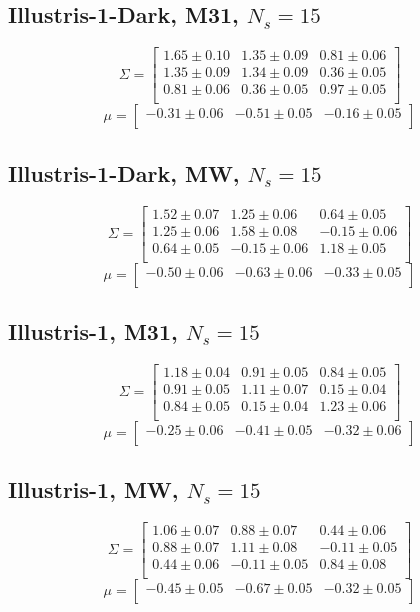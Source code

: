 \documentclass[a4paper,fleqn,usenatbib]{mnras}
\begin{document}
\subsection{Illustris-1-Dark, M31, $N_s=15$}
\[
\Sigma=
\begin{bmatrix}
1.65 \pm 0.10 & 1.35 \pm 0.09 & 0.81 \pm 0.06\\
1.35 \pm 0.09 & 1.34 \pm 0.09 & 0.36 \pm 0.05\\
0.81 \pm 0.06 & 0.36 \pm 0.05 & 0.97 \pm 0.05\\
\end{bmatrix}
\]
\[
\mu=
\begin{bmatrix}
-0.31 \pm 0.06 & -0.51 \pm 0.05 & -0.16 \pm 0.05\\
\end{bmatrix}
\]
\subsection{Illustris-1-Dark, MW, $N_s=15$}
\[
\Sigma=
\begin{bmatrix}
1.52 \pm 0.07 & 1.25 \pm 0.06 & 0.64 \pm 0.05\\
1.25 \pm 0.06 & 1.58 \pm 0.08 & -0.15 \pm 0.06\\
0.64 \pm 0.05 & -0.15 \pm 0.06 & 1.18 \pm 0.05\\
\end{bmatrix}
\]
\[
\mu=
\begin{bmatrix}
-0.50 \pm 0.06 & -0.63 \pm 0.06 & -0.33 \pm 0.05\\
\end{bmatrix}
\]

\subsection{Illustris-1, M31, $N_s=15$}
\[
\Sigma=
\begin{bmatrix}
1.18 \pm 0.04 & 0.91 \pm 0.05 & 0.84 \pm 0.05\\
0.91 \pm 0.05 & 1.11 \pm 0.07 & 0.15 \pm 0.04\\
0.84 \pm 0.05 & 0.15 \pm 0.04 & 1.23 \pm 0.06\\
\end{bmatrix}
\]
\[
\mu=
\begin{bmatrix}
-0.25 \pm 0.06 & -0.41 \pm 0.05 & -0.32 \pm 0.06\\
\end{bmatrix}
\]
\subsection{Illustris-1, MW, $N_s=15$}
\[
\Sigma=
\begin{bmatrix}
1.06 \pm 0.07 & 0.88 \pm 0.07 & 0.44 \pm 0.06\\
0.88 \pm 0.07 & 1.11 \pm 0.08 & -0.11 \pm 0.05\\
0.44 \pm 0.06 & -0.11 \pm 0.05 & 0.84 \pm 0.08\\
\end{bmatrix}
\]
\[
\mu=
\begin{bmatrix}
-0.45 \pm 0.05 & -0.67 \pm 0.05 & -0.32 \pm 0.05\\
\end{bmatrix}
\]
\end{document}
